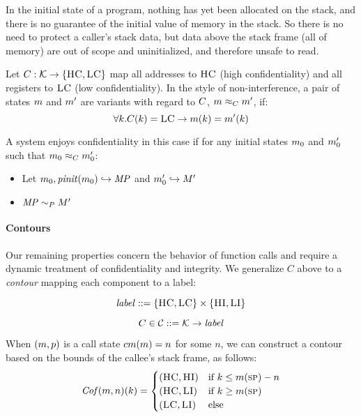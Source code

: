 \documentclass[conference]{IEEEtran}
\begin{document}
      In the initial state of a program, nothing has yet been allocated on the stack, and
      there is no guarantee of the initial value of memory in the stack. So there is no
      need to protect a caller's stack data, but data above the stack frame
      (all of memory) are out of scope and uninitialized, and therefore unsafe to read.

      Let \(C : {\mathcal K} \rightarrow \{\textsc{HC},\textsc{LC}\}\) map all addresses
      to \(\textsc{HC}\) (high confidentiality) and all registers to \(\textsc{LC}\)
      (low confidentiality). In the style of non-interference, a pair of states \(m\)
      and \(m'\) are variants with regard to \(C\), \(m \approx_C m'\), if:
      \[\forall k . C(k) = \textsc{LC} \rightarrow m(k) = m'(k)\]
      
      A system enjoys confidentiality in this case if for any initial states \(m_0\)
      and \(m_0'\) such that \(m_0 \approx_C m_0'\):

      \begin{itemize}
        \item Let \(m_0,\mathit{pinit}(m_0) \hookrightarrow \mathit{MP}\) and \(m_0' \hookrightarrow M'\)
        \item \(\mathit{MP} \sim_P M'\)
      \end{itemize}

    \paragraph{Contours}

      Our remaining properties concern the behavior of function calls and require a dynamic treatment
      of confidentiality and integrity. We generalize \(C\) above to a {\it contour} mapping each component
      to a label:

      \[\mathit{label} ::= \{\textsc{HC},\textsc{LC}\} \times \{\textsc{HI},\textsc{LI}\}\]

      \[C \in {\mathcal C} ::= {\mathcal K} \rightarrow \mathit{label}\]

      When \((m,p)\) is a call state \(cm(m) = n\) for some \(n\),
      we can construct a contour based on the bounds of the callee's stack frame, as follows:
      \[\mathit{Cof}(m,n)(k) =
      \begin{cases}
        (\textsc{HC},\textsc{HI}) & \text{if } k \leq m(\textsc{sp}) - n \\
        (\textsc{HC},\textsc{LI}) & \text{if } k \geq m(\textsc{sp}) \\
        (\textsc{LC},\textsc{LI}) & \text{else} \\
      \end{cases}\]
\end{document}
